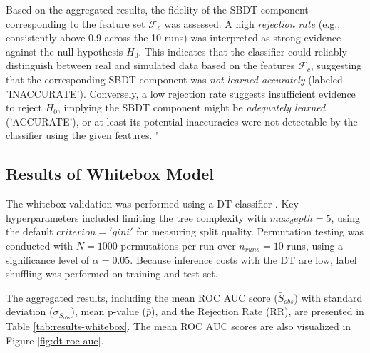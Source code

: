 Based on the aggregated results, the fidelity of the SBDT component corresponding to the feature set $\mathcal{F}_c$ was assessed. A high \textit{rejection rate} (e.g., consistently above 0.9 across the 10 runs) was interpreted as strong evidence against the null hypothesis $H_0$. This indicates that the classifier could reliably distinguish between real and simulated data based on the features $\mathcal{F}_c$, suggesting that the corresponding SBDT component was \textit{not learned accurately} (labeled 'INACCURATE'). Conversely, a low rejection rate suggests insufficient evidence to reject $H_0$, implying the SBDT component might be \textit{adequately learned} ('ACCURATE'), or at least its potential inaccuracies were not detectable by the classifier using the given features.
"
\subsection*{Results of Whitebox Model}

The whitebox validation was performed using a DT classifier \autocite{Scikit-Learn}. Key hyperparameters included limiting the tree complexity with $max_depth=5$, using the default $criterion='gini'$ for measuring split quality. Permutation testing was conducted with $N = 1000$ permutations per run over $n_{runs}=10$ runs, using a significance level of $\alpha = 0.05$. Because inference costs with the DT are low, label shuffling was performed on training and test set.

The aggregated results, including the mean ROC AUC score ($\bar{S}_{obs}$) with standard deviation ($\sigma_{S_{obs}}$), mean p-value ($\bar{p}$), and the Rejection Rate (RR), are presented in Table \ref{tab:results-whitebox}. The mean ROC AUC scores are also visualized in Figure \ref{fig:dt-roc-auc}.

